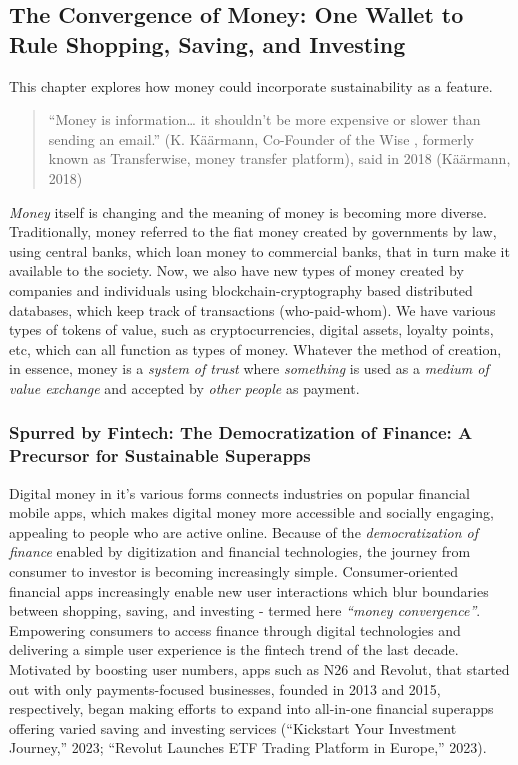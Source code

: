 \documentclass[
  12pt,
  letterpaper,
  DIV=11,
  numbers=noendperiod]{scrartcl}
\begin{document}
\subsection{The Convergence of Money: One Wallet to Rule Shopping,
Saving, and
Investing}\label{the-convergence-of-money-one-wallet-to-rule-shopping-saving-and-investing}

This chapter explores how money could incorporate sustainability as a
feature.

\begin{quote}
``Money is information\ldots{} it shouldn't be more expensive or slower
than sending an email.'' (K. Käärmann, Co-Founder of the Wise , formerly
known as Transferwise, money transfer platform), said in 2018 (Käärmann,
2018)
\end{quote}

\emph{Money} itself is changing and the meaning of money is becoming
more diverse. Traditionally, money referred to the fiat money created by
governments by law, using central banks, which loan money to commercial
banks, that in turn make it available to the society. Now, we also have
new types of money created by companies and individuals using
blockchain-cryptography based distributed databases, which keep track of
transactions (who-paid-whom). We have various types of tokens of value,
such as cryptocurrencies, digital assets, loyalty points, etc, which can
all function as types of money. Whatever the method of creation, in
essence, money is a \emph{system of trust} where \emph{something} is
used as a \emph{medium of value exchange} and accepted by \emph{other
people} as payment.

\subsubsection{Spurred by Fintech: The Democratization of Finance: A
Precursor for Sustainable
Superapps}\label{spurred-by-fintech-the-democratization-of-finance-a-precursor-for-sustainable-superapps}

Digital money in it's various forms connects industries on popular
financial mobile apps, which makes digital money more accessible and
socially engaging, appealing to people who are active online. Because of
the \emph{democratization of finance} enabled by digitization and
financial technologies\emph{,} the journey from consumer to investor is
becoming increasingly simple\emph{.} Consumer-oriented financial apps
increasingly enable new user interactions which blur boundaries between
shopping, saving, and investing - termed here \emph{``money
convergence''}. Empowering consumers to access finance through digital
technologies and delivering a simple user experience is the fintech
trend of the last decade. Motivated by boosting user numbers, apps such
as N26 and Revolut, that started out with only payments-focused
businesses, founded in 2013 and 2015, respectively, began making efforts
to expand into all-in-one financial superapps offering varied saving and
investing services ({``Kickstart Your Investment Journey,''} 2023;
{``Revolut Launches {ETF} Trading Platform in {Europe},''} 2023).
\end{document}
